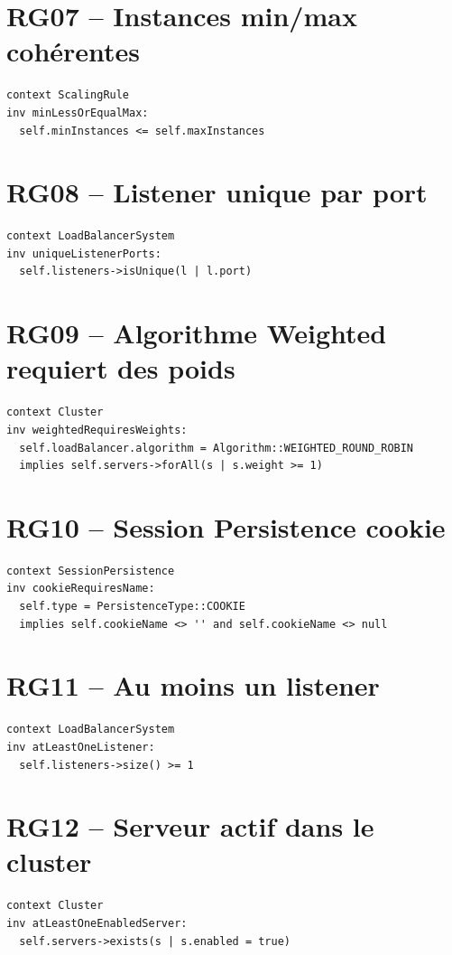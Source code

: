 \documentclass[12pt,a4paper]{report}
\begin{document}
\section{RG07 -- Instances min/max cohérentes}
\begin{lstlisting}[language=OCL]
context ScalingRule
inv minLessOrEqualMax:
  self.minInstances <= self.maxInstances
\end{lstlisting}

\section{RG08 -- Listener unique par port}
\begin{lstlisting}[language=OCL]
context LoadBalancerSystem
inv uniqueListenerPorts:
  self.listeners->isUnique(l | l.port)
\end{lstlisting}

\section{RG09 -- Algorithme Weighted requiert des poids}
\begin{lstlisting}[language=OCL]
context Cluster
inv weightedRequiresWeights:
  self.loadBalancer.algorithm = Algorithm::WEIGHTED_ROUND_ROBIN
  implies self.servers->forAll(s | s.weight >= 1)
\end{lstlisting}

\section{RG10 -- Session Persistence cookie}
\begin{lstlisting}[language=OCL]
context SessionPersistence
inv cookieRequiresName:
  self.type = PersistenceType::COOKIE
  implies self.cookieName <> '' and self.cookieName <> null
\end{lstlisting}

\section{RG11 -- Au moins un listener}
\begin{lstlisting}[language=OCL]
context LoadBalancerSystem
inv atLeastOneListener:
  self.listeners->size() >= 1
\end{lstlisting}

\section{RG12 -- Serveur actif dans le cluster}
\begin{lstlisting}[language=OCL]
context Cluster
inv atLeastOneEnabledServer:
  self.servers->exists(s | s.enabled = true)
\end{lstlisting}
\end{document}
